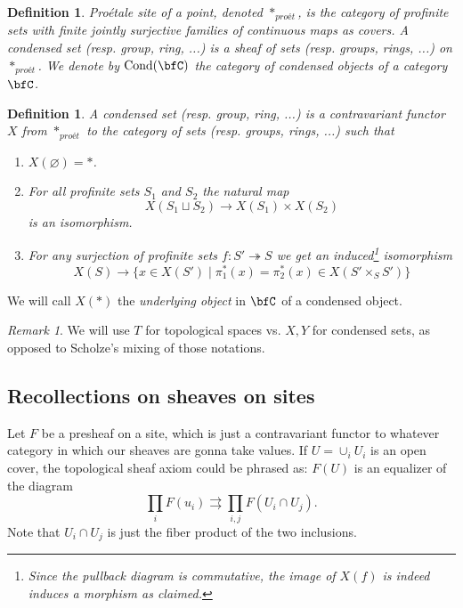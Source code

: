 \documentclass[A4paper, british]{amsart}
\theoremstyle{darkgreentheorem}
\theoremstyle{darkbluedefinition}
\newtheorem{defn}[thm]{Definition}
\theoremstyle{darkredexample}
\theoremstyle{remark}
\newtheorem{rem}[thm]{Remark}
\DeclareMathOperator{\Cond}{Cond}
\newcommand{\1}{\mathbbm{1}}
\newcommand{\pe}{*_{proét}}
\newcommand{\fp}[1]{\times_{#1}}
\begin{document}
\begin{defn}
    Pro\'{e}tale site of a point, denoted $\pe$, is the category of profinite sets with finite jointly surjective families of continuous maps as covers.
    A \textit{condensed set} (resp. group, ring, ...) is a sheaf of sets (resp. groups, rings, ...) on $\pe$.
    We denote by $\Cond(\bfC)$ the category of condensed objects of a category $\bfC$.
\end{defn}

\begin{defn}
    A \textit{condensed set} (resp. group, ring, ...) is a contravariant functor $X$ from $\pe$ to the category of sets (resp. groups, rings, ...) such that 
    \begin{enumerate}[label=\roman*)]
	\item $X(\varnothing)=*$.
	\item For all profinite sets $S_{1}$ and $S_{2}$ the natural map
	    \[ X(S_{1}\sqcup S_{2})\to X(S_{1})\times X(S_{2}) \]
	    is an isomorphism.
	\item For any surjection of profinite sets $f\colon S'\twoheadrightarrow S$ we get an induced\footnote{Since the pullback diagram is commutative, the image of $X(f)$ is indeed induces a morphism as claimed.} isomorphism
	    \[ X(S)\to \{ x\in X(S')\mid \pi_{1}^{*}(x)=\pi_{2}^{*}(x)\in X(S'\fp{S}S')\} \]
    \end{enumerate}
\end{defn}

We will call $X(*)$ the \textit{underlying object} in $\bfC$ of a condensed object.

\begin{rem}
    We will use $T$ for topological spaces vs. $X,Y$ for condensed sets, as opposed to Scholze's mixing of those notations.
\end{rem}

\subsection{Recollections on sheaves on sites}

Let $F$ be a presheaf on a site, which is just a contravariant functor to whatever category in which our sheaves are gonna take values.
If $U=\cup_{i}U_{i}$ is an open cover, the topological sheaf axiom could be phrased as: $F(U)$ is an equalizer of the diagram
\[ \prod_{i}F(u_{i})\rightrightarrows \prod_{i,j}F(U_{i}\cap U_{j}). \]
Note that $U_{i}\cap U_{j}$ is just the fiber product of the two inclusions.
\end{document}
